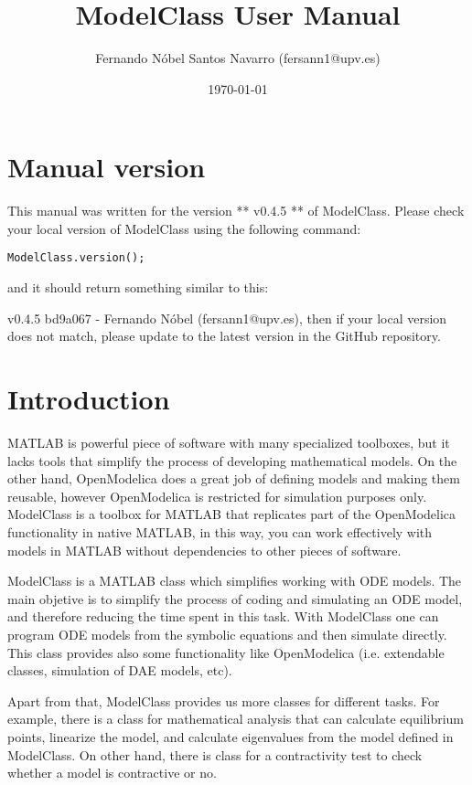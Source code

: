\documentclass[11pt]{article}
\title{ModelClass User Manual}
\author{Fernando Nóbel Santos Navarro (fersann1@upv.es)}
\date{\today}
\begin{document}
\maketitle

\tableofcontents

\newpage 

\setlength{\parskip}{0.5em}

\section{Manual version}

This manual was written for the version **
v0.4.5
** of ModelClass. Please check your local version of ModelClass using the following command:

\begin{lstlisting}
ModelClass.version();
\end{lstlisting}

and it should return something similar to this:

v0.4.5 bd9a067   -   Fernando Nóbel (fersann1@upv.es), then if your local version does not match, please update to the latest version in the GitHub repository.

\section{Introduction}

MATLAB is powerful piece of software with many specialized toolboxes, but it lacks tools that simplify the process of developing mathematical models.
On the other hand, OpenModelica does a great job of defining models and making them reusable, however OpenModelica is restricted for simulation purposes only.
ModelClass is a toolbox for MATLAB that replicates part of the OpenModelica functionality in native MATLAB, in this way, you can work effectively with models in MATLAB without dependencies to other pieces of software.

ModelClass is a MATLAB class which simplifies working with ODE models. The main objetive is to simplify the process of coding and simulating an ODE model, and therefore reducing the time spent in this task. With ModelClass one can program ODE models from the symbolic equations and then simulate directly. This class provides also some functionality like OpenModelica (i.e. extendable classes, simulation of DAE models, etc).

Apart from that, ModelClass provides us more classes for different tasks. For example, there is a class for mathematical analysis that can calculate equilibrium points, linearize the model, and calculate eigenvalues from the model defined in ModelClass. On other hand, there is class for a contractivity test to check whether a model is contractive or no.
\end{document}

